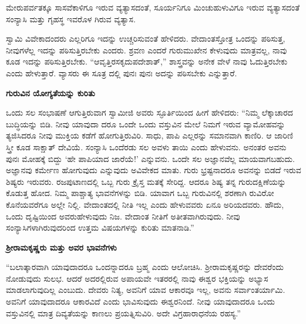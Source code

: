 ಮೇರುಪರ್ವತಕ್ಕೂ ಸಾಸವೆಕಾಳಿಗೂ ಇರುವ ವ್ಯತ್ಯಾಸದಂತೆ, ಸೂರ್ಯನಿಗೂ ಮಿಂಚುಹುಳುವಿಗೂ ಇರುವ ವ್ಯತ್ಯಾಸದಂತೆ ಸಂನ್ಯಾಸಿ ಮತ್ತು ಗೃಹಸ್ಥ ಇವರೊಳ ಗಿರುವ ವ್ಯತ್ಯಾಸ.

ಸ್ವಾಮಿ ವಿವೇಕಾದಂದರು ಎಲ್ಲರಿಗೂ ಇದನ್ನು ಉಚ್ಚರಿಸುವಂತೆ ಹೇಳಿದರು. ವೇದಾಂತಸ್ತೋತ್ರ ಒಂದನ್ನು ಪಠಿಸುತ್ತ, ನೀವುಗಳೆಲ್ಲ ಇದನ್ನು ಪಠಿಸುತ್ತಿರಬೇಕು ಎಂದರು. ಶ್ರವಣ ಎಂದರೆ ಗುರುಮುಖೇನ ಕೇಳುವುದು ಮಾತ್ರವಲ್ಲ, ನಾವು ಕೂಡ ಇದನ್ನು ಪಠಿಸುತ್ತಿರಬೇಕು. “ಆವೃತ್ತಿರಸಕೃದುಪದೇಶಾತ್​,” ಶಾಸ್ತ್ರವನ್ನು ಅನೇಕ ವೇಳೆ ನಾವು ಓದುತ್ತಿರಬೇಕು ಎಂದು ಹೇಳುತ್ತಾರೆ. ವ್ಯಾಸರು ಈ ಸೂತ್ರ ದಲ್ಲಿ ಪುನಃ ಪುನಃ ಅದನ್ನು ಪಠಿಸಬೇಕು ಎನ್ನುತ್ತಾರೆ.

\begin{center}
\textbf{ಗುರುವಿನ ಯೋಗ್ಯತೆಯನ್ನು ಕುರಿತು}
\end{center}

ಒಂದು ಸಲ ಸಂಭಾಷಣೆ ಆಗುತ್ತಿರುವಾಗ ಸ್ವಾಮೀಜಿ ಅವರು ಸ್ಫೂರ್ತಿಯಿಂದ ಹೀಗೆ ಹೇಳಿದರು: “ನಿಮ್ಮ ಲೆಕ್ಕಾಚಾರದ ಬುದ್ಧಿಯನ್ನು ಬಿಡಿ. ನೀವು ಯಾವುದಾ ದರೂ ಒಂದೇ ಒಂದು ವಸ್ತುವಿನ ಮೇಲೆ ನಿಮಗೆ ಇರುವ ವ್ಯಾಮೋಹವನ್ನು ತ್ಯಜಿಸಿದರೂ ನೀವು ಮುಕ್ತಿಯ ಕಡೆಗೆ ಹೋಗುತ್ತಿರುವಿರಿ. ಸಾಧು, ಪಾಪಿ ಎಲ್ಲರನ್ನು ಸಮಾನವಾಗಿ ಕಾಣಿರಿ. ಆ ಜಾರಿಣಿ ಸ್ತ್ರೀ ಕೂಡ ಸಾಕ್ಷಾತ್​ ದೇವಿಯೆ. ಸಂನ್ಯಾಸಿ ಒಂದೆರಡು ಸಲ ಅವಳು ತಾಯಿ ಎಂದು ಹೇಳುವನು. ಅನಂತರ ಅವನು ಪುನಃ ಮೋಹಕ್ಕೆ ಬಿದ್ದು ‘ಹೇ ಪಾಪಿಯಾದ ಜಾರೆಯೆ!’ ಎನ್ನುವನು. ಒಂದೇ ಸಲ ಅಜ್ಞಾನವೆಲ್ಲ ಮಾಯವಾಗಬಹುದು. ಅಜ್ಞಾನವು ಕರ್ಮೇಣ ಹೋಗುವುದು ಎನ್ನುವುದು ಅವಿವೇಕದ ಮಾತು. ಗುರು ಭ್ರಷ್ಟನಾದರೂ ಅವನನ್ನು ಬಿಡದೆ ಇರುವ ಶಿಷ್ಯರು ಇರುವರು. ರಜಪುಟಾಣದಲ್ಲಿ ಒಬ್ಬ ಗುರು ಕ್ರೈಸ್ತ ಮತಕ್ಕೆ ಸೇರಿದ್ದ. ಆದರೂ ಶಿಷ್ಯ ತನ್ನ ಗುರುದಕ್ಷಿಣೆಯನ್ನು ಕೊಡುತ್ತ ಹೋದ. ನಿಮ್ಮ ಪಾಶ್ಚಾತ್ಯ ಭಾವನೆಗಳನ್ನು ಬಿಡಿ. ಯಾವಾಗ ಒಬ್ಬ ಗುರುವಿನಲ್ಲಿ ಶರಣಾಗಿ ರುವಿರೋ ಕೊನೆಯವರೆಗೂ ಅಲ್ಲೇ ನಿಲ್ಲಿ. ವೇದಾಂತದಲ್ಲಿ ನೀತಿ ಇಲ್ಲ ಎಂದು ಹೇಳುವವರು ಏನೂ ಅರಿಯದವರು. ಹೌದು, ಒಂದು ದೃಷ್ಟಿಯಿಂದ ಅವರುಹೇಳುವುದು ನಿಜ. ವೇದಾಂತ ನೀತಿಗೆ ಅತೀತವಾಗಿರುವುದು. ನೀವು ಸಂನ್ಯಾಸಿಗಳಾಗಿರುವುದರಿಂದ ಉತ್ತಮ ವಿಷಯಗಳನ್ನು ಕುರಿತು ಮಾತನಾಡಿ.”

\begin{center}
\textbf{ಶ‍್ರೀರಾಮಕೃಷ್ಣರು ಮತ್ತು ಅವರ ಭಾವನೆಗಳು}
\end{center}

“ಬಲಾತ್ಕಾರವಾಗಿ ಯಾವುದಾದರೂ ಒಂದನ್ನಾದರೂ ಬ್ರಹ್ಮ ಎಂದು ಆಲೋಚಿಸಿ. ಶ‍್ರೀರಾಮಕೃಷ್ಣರನ್ನು ದೇವರೆಂದು ನೋಡುವುದು ಸುಲಭ. ಆದರೆ ಅದರಲ್ಲಿರುವ ಅಪಾಯವೇ ಇತರರಲ್ಲಿ ನಾವು ಈಶ್ವರ ಭಕ್ತಿಯನ್ನು ಅಭ್ಯಾಸ ಮಾಡಲಾಗುವುದಿಲ್ಲ ಎಂಬುದು. ದೇವರು ನಿತ್ಯ, ಅವನಿಗೆ ಯಾವ ಆಕಾರವೂ ಇಲ್ಲ, ಅವನು ಸರ್ವಾಂತರ್ಯಾಮಿ. ಅವನಿಗೆ ಯಾವುದಾದರೂ ಆಕಾರವಿದೆ ಎಂದು ಭಾವಿಸುವುದು ಈಶ್ವರನಿಂದೆ. ನೀವು ಯಾವುದಾದರೂ ಒಂದು ವಸ್ತುವಿನಲ್ಲಿ ಮಾತ್ರ ದಿವ್ಯತೆಯನ್ನು ಕಾಣಲು ಪ್ರಯತ್ನಿಸುವಿರಿ. ಅದೇ ವಿಗ್ರಹಾರಾಧನೆಯ ರಹಸ್ಯ.”

